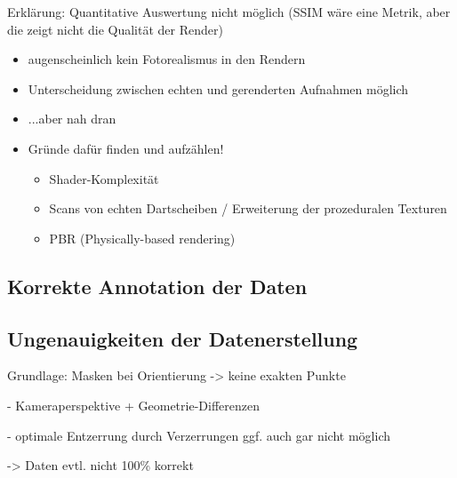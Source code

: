 Erklärung: Quantitative Auswertung nicht möglich (SSIM wäre eine Metrik, aber die zeigt nicht die Qualität der Render)

\begin{itemize}
    \item augenscheinlich kein Fotorealismus in den Rendern
    \item Unterscheidung zwischen echten und gerenderten Aufnahmen möglich
    \item ...aber nah dran
    \item Gründe dafür finden und aufzählen!
          \begin{itemize}
              \item Shader-Komplexität
              \item Scans von echten Dartscheiben / Erweiterung der prozeduralen Texturen
              \item PBR (Physically-based rendering)
          \end{itemize}
\end{itemize}

\todo{}

\subsection{Korrekte Annotation der Daten}  %
\label{sec:korrekte_annotation}  %

\todo{}

\subsection{Ungenauigkeiten der Datenerstellung}  %
\label{sec:daten_ungenauigkeiten}

Grundlage: Masken bei Orientierung -> keine exakten Punkte

- Kameraperspektive + Geometrie-Differenzen

- optimale Entzerrung durch Verzerrungen ggf. auch gar nicht möglich

->  Daten evtl. nicht 100\% korrekt

\todo{}
